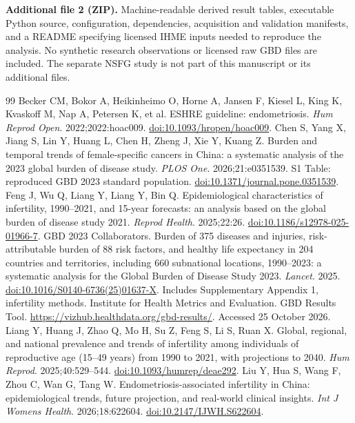 \documentclass[11pt,a4paper]{article}
\begin{document}
\textbf{Additional file 2 (ZIP).} Machine-readable derived result tables, executable Python source, configuration, dependencies, acquisition and validation manifests, and a README specifying licensed IHME inputs needed to reproduce the analysis. No synthetic research observations or licensed raw GBD files are included. The separate NSFG study is not part of this manuscript or its additional files.
{\small\doublespacing
\begin{thebibliography}{99}
Becker CM, Bokor A, Heikinheimo O, Horne A, Jansen F, Kiesel L, King K, Kvaskoff M, Nap A, Petersen K, et al. ESHRE guideline: endometriosis. \emph{Hum Reprod Open}. 2022;2022:hoac009. \href{https://doi.org/10.1093/hropen/hoac009}{doi:10.1093/hropen/hoac009}.
Chen S, Yang X, Jiang S, Lin Y, Huang L, Chen H, Zheng J, Xie Y, Kuang Z. Burden and temporal trends of female-specific cancers in China: a systematic analysis of the 2023 global burden of disease study. \emph{PLOS One}. 2026;21:e0351539. S1 Table: reproduced GBD 2023 standard population. \href{https://doi.org/10.1371/journal.pone.0351539}{doi:10.1371/journal.pone.0351539}.
Feng J, Wu Q, Liang Y, Liang Y, Bin Q. Epidemiological characteristics of infertility, 1990--2021, and 15-year forecasts: an analysis based on the global burden of disease study 2021. \emph{Reprod Health}. 2025;22:26. \href{https://doi.org/10.1186/s12978-025-01966-7}{doi:10.1186/s12978-025-01966-7}.
 GBD 2023 Collaborators. Burden of 375 diseases and injuries, risk-attributable burden of 88 risk factors, and healthy life expectancy in 204 countries and territories, including 660 subnational locations, 1990--2023: a systematic analysis for the Global Burden of Disease Study 2023. \emph{Lancet}. 2025. \href{https://doi.org/10.1016/S0140-6736(25)01637-X}{doi:10.1016/S0140-6736(25)01637-X}. Includes Supplementary Appendix 1, infertility methods.
 Institute for Health Metrics and Evaluation. GBD Results Tool. \url{https://vizhub.healthdata.org/gbd-results/}. Accessed 25 October 2026.
 Liang Y, Huang J, Zhao Q, Mo H, Su Z, Feng S, Li S, Ruan X. Global, regional, and national prevalence and trends of infertility among individuals of reproductive age (15--49 years) from 1990 to 2021, with projections to 2040. \emph{Hum Reprod}. 2025;40:529--544. \href{https://doi.org/10.1093/humrep/deae292}{doi:10.1093/humrep/deae292}.
 Liu Y, Hua S, Wang F, Zhou C, Wan G, Tang W. Endometriosis-associated infertility in China: epidemiological trends, future projection, and real-world clinical insights. \emph{Int J Womens Health}. 2026;18:622604. \href{https://doi.org/10.2147/IJWH.S622604}{doi:10.2147/IJWH.S622604}.

\end{thebibliography}}
\end{document}
